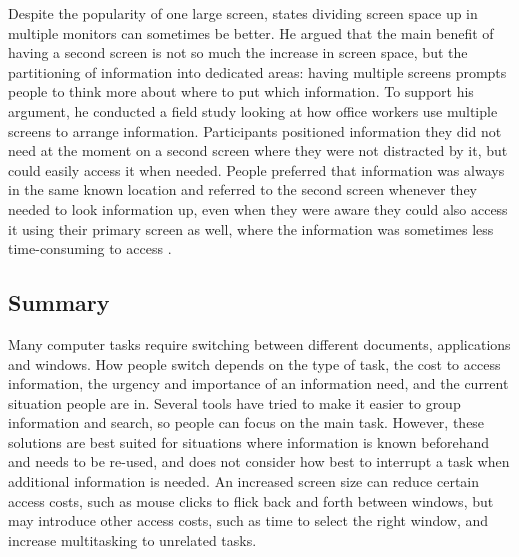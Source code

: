Despite the popularity of one large screen, \citet{Grudin2001} states dividing screen space up in multiple monitors can sometimes be better. He argued that the main benefit of having a second screen is not so much the increase in screen space, but the partitioning of information into dedicated areas: having multiple screens prompts people to think more about where to put which information. To support his argument, he conducted a field study looking at how office workers use multiple screens to arrange information. Participants positioned information they did not need at the moment on a second screen where they were not distracted by it, but could easily access it when needed. People preferred that information was always in the same known location and referred to the second screen whenever they needed to look information up, even when they were aware they could also access it using their primary screen as well, where the information was sometimes less time-consuming to access \citep{Grudin2001}. 

\subsection{Summary}
Many computer tasks require switching between different documents, applications and windows. How people switch depends on the type of task, the cost to access information, the urgency and importance of an information need, and the current situation people are in. Several tools have tried to make it easier to group information and search, so people can focus on the main task. However, these solutions are best suited for situations where information is known beforehand and needs to be re-used, and does not consider how best to interrupt a task when additional information is needed. An increased screen size can reduce certain access costs, such as mouse clicks to flick back and forth between windows, but may introduce other access costs, such as time to select the right window, and increase multitasking to unrelated tasks.

